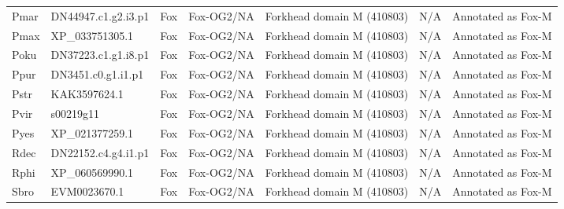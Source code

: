 \documentclass[../main.tex]{subfiles}
\begin{document}
\begin{landscape}
\begin{longtable}{lllllll}
		Pmar           & DN44947.c1.g2.i3.p1   & Fox            & Fox-OG2/NA          & Forkhead domain M (410803)                  & N/A                                                                    & Annotated as Fox-M   \\
		Pmax           & XP\_033751305.1       & Fox            & Fox-OG2/NA          & Forkhead domain M (410803)                  & N/A                                                                    & Annotated as Fox-M   \\
		Poku           & DN37223.c1.g1.i8.p1   & Fox            & Fox-OG2/NA          & Forkhead domain M (410803)                  & N/A                                                                    & Annotated as Fox-M   \\
		Ppur           & DN3451.c0.g1.i1.p1    & Fox            & Fox-OG2/NA          & Forkhead domain M (410803)                  & N/A                                                                    & Annotated as Fox-M   \\
		Pstr           & KAK3597624.1          & Fox            & Fox-OG2/NA          & Forkhead domain M (410803)                  & N/A                                                                    & Annotated as Fox-M   \\
		Pvir           & s00219g11             & Fox            & Fox-OG2/NA          & Forkhead domain M (410803)                  & N/A                                                                    & Annotated as Fox-M   \\
		Pyes           & XP\_021377259.1       & Fox            & Fox-OG2/NA          & Forkhead domain M (410803)                  & N/A                                                                    & Annotated as Fox-M   \\
		Rdec           & DN22152.c4.g4.i1.p1   & Fox            & Fox-OG2/NA          & Forkhead domain M (410803)                  & N/A                                                                    & Annotated as Fox-M   \\
		Rphi           & XP\_060569990.1       & Fox            & Fox-OG2/NA          & Forkhead domain M (410803)                  & N/A                                                                    & Annotated as Fox-M   \\
		Sbro           & EVM0023670.1          & Fox            & Fox-OG2/NA          & Forkhead domain M (410803)                  & N/A                                                                    & Annotated as Fox-M   \\

\end{longtable}
\end{landscape}
\end{document}
